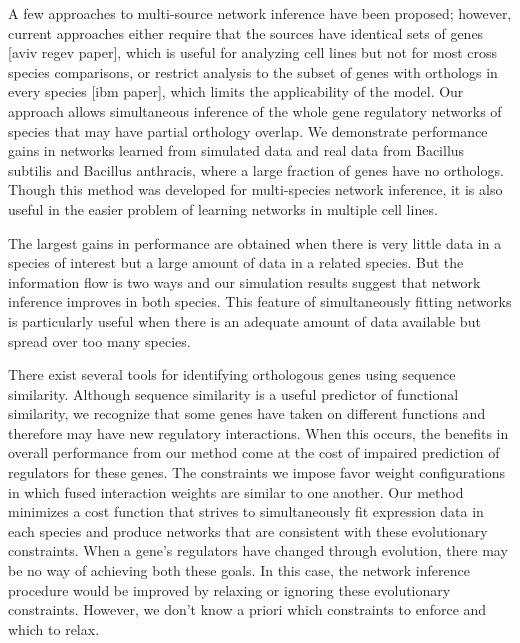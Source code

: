 \documentclass[11pt]{article}
\begin{document}
A few approaches to multi-source network inference have been proposed; however, current approaches either require that the sources have identical sets of genes [aviv regev paper], which is useful for analyzing cell lines but not for most cross species comparisons, or restrict analysis to the subset of genes with orthologs in every species [ibm paper], which limits the applicability of the model. Our approach allows simultaneous inference of the whole gene regulatory networks of species that may have partial orthology overlap. We demonstrate performance gains in networks learned from simulated data and real data from Bacillus subtilis and Bacillus anthracis, where a large fraction of genes have no orthologs. Though this method was developed for multi-species network inference, it is also useful in the easier problem of learning networks in multiple cell lines. 

The largest gains in performance are obtained when there is very little data in a species of interest but a large amount of data in a related species. But the information flow is two ways and our simulation results suggest that network inference improves in both species. This feature of simultaneously fitting networks is particularly useful when there is an adequate amount of data available but spread over too many species.

There exist several tools for identifying orthologous genes using sequence similarity. Although sequence similarity is a useful predictor of functional similarity, we recognize that some genes have taken on different functions and therefore may have new regulatory interactions. When this occurs, the benefits in overall performance from our method come at the cost of impaired prediction of regulators for these genes. The constraints we impose favor weight configurations in which fused interaction weights are similar to one another. Our method minimizes a cost function that strives  to simultaneously fit expression data in each species and produce networks that are consistent with these evolutionary constraints. When a gene's regulators have changed through evolution, there may be no way of achieving both these goals. In this case, the network inference procedure would be improved by relaxing or ignoring these evolutionary constraints. However, we don't know a priori which constraints to enforce and which to relax.  
\end{document}
